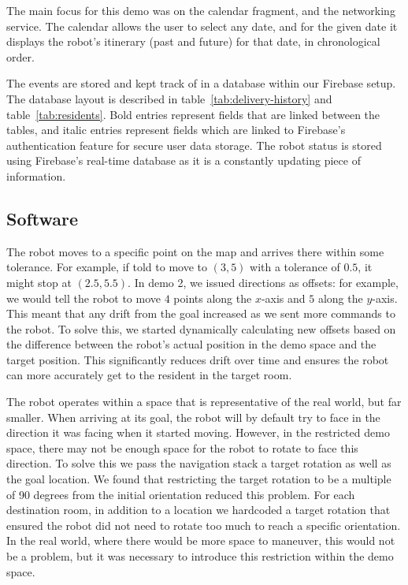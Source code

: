 \documentclass{article}
\begin{document}
The main focus for this demo was on the calendar fragment, and the networking service. The calendar allows the user to select any date, and for the given date it displays the robot's itinerary (past and future) for that date, in chronological order.

 The events are stored and kept track of in a database within our Firebase setup. The database layout is described in table~\ref{tab:delivery-history} and table~\ref{tab:residents}. Bold entries represent fields that are linked between the tables, and italic entries represent fields which are linked to Firebase's authentication feature for secure user data storage. The robot status is stored using Firebase's real-time database as it is a constantly updating piece of information. 

\subsection{Software}
The robot moves to a specific point on the map and arrives there within some tolerance. For example, if told to move to $(3, 5)$ with a tolerance of $0.5$, it might stop at $(2.5, 5.5)$. In demo 2, we issued directions as offsets: for example, we would tell the robot to move $4$ points along the $x$-axis and $5$ along the $y$-axis. This meant that any drift from the goal increased as we sent more commands to the robot. To solve this, we started dynamically calculating new offsets based on the difference between the robot's actual position in the demo space and the target position. This significantly reduces drift over time and ensures the robot can more accurately get to the resident in the target room. 

The robot operates within a space that is representative of the real world, but far smaller. When arriving at its goal, the robot will by default try to face in the direction it was facing when it started moving. However, in the restricted demo space, there may not be enough space for the robot to rotate to face this direction. To solve this we pass the navigation stack a target rotation as well as the goal location. We found that restricting the target rotation to be a multiple of 90 degrees from the initial orientation reduced this problem. For each destination room, in addition to a location we hardcoded a target rotation that ensured the robot did not need to rotate too much to reach a specific orientation. In the real world, where there would be more space to maneuver, this would not be a problem, but it was necessary to introduce this restriction within the demo space.
\end{document}
